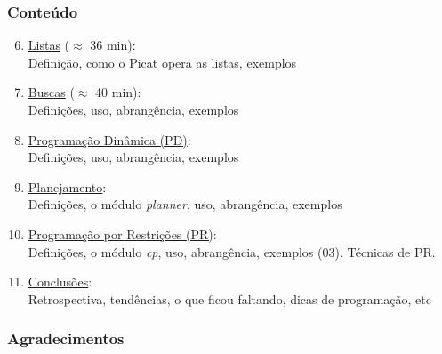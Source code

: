 			
\begin{frame}[fragile]
  \frametitle{Conteúdo}
  
  \begin{enumerate}

   \setcounter{enumi}{5}
    \item  \underline{Listas} ($\approx$ 36 min):\\
    Definição, como o Picat opera as listas, exemplos


    \pause
    \item  \underline{Buscas} ($\approx$ 40 min):\\
    Definições, uso, abrangência, exemplos

    \pause
    \item \underline{Programação Dinâmica (PD)}:\\
        Definições, uso, abrangência, exemplos

    
    \pause
    \item \underline{Planejamento}:\\
        Definições, o módulo \textit{planner}, uso, abrangência, exemplos

    \pause
		\item  \underline{Programação por Restrições (PR)}:\\
      Definições, o módulo \textit{cp}, uso, abrangência, exemplos (03).
      Técnicas de PR.

    \pause
		\item  \underline{Conclusões}:\\
    Retrospectiva, tendências, o que ficou faltando, dicas de programação, etc
    
\end{enumerate}

\end{frame}



\begin{frame}[fragile]
  \frametitle{Agradecimentos}


						



\end{frame}
